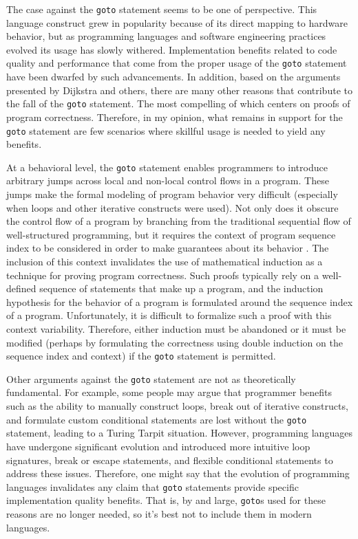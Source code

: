 \documentclass[12pt,letterpaper]{article}
\begin{document}
The case against the {\tt goto} statement seems to be one of perspective. This language construct 
grew in popularity because of its direct mapping to hardware behavior, but as programming languages
and software engineering practices evolved its usage has slowly withered. Implementation
benefits related to code quality and performance that come from the proper usage of the {\tt goto} 
statement have been dwarfed by such advancements. In addition, based on the arguments
presented by Dijkstra \cite{Dijkstra1968} and others, there are many other reasons that contribute to the 
fall of the {\tt goto} statement. The most compelling of which centers on proofs of program correctness. 
Therefore, in my opinion, what remains in support for the {\tt goto} statement are few scenarios 
where skillful usage is needed to yield any benefits.

At a behavioral level, the {\tt goto} statement enables programmers to introduce arbitrary jumps 
across local and non-local control flows in a program. These jumps
make the formal modeling of program behavior very difficult (especially when loops and other iterative constructs were used). 
Not only does it obscure the control flow of a program by 
branching from the traditional sequential flow of well-structured programming, but it requires the 
context of program sequence index to be considered in order to make guarantees about its
behavior \cite{Dijkstra1968}. The inclusion of this context invalidates the use of mathematical induction as a 
technique for proving program correctness. Such proofs typically rely on a well-defined 
sequence of statements that make up a program, and the induction hypothesis for the behavior of a 
program is formulated around the sequence index of a program. 
Unfortunately, it is difficult to formalize such a proof with this context variability. 
Therefore, either induction must be abandoned or it must be modified (perhaps by formulating the
correctness using double induction on the sequence index and context) if the {\tt goto} statement
is permitted. 

Other arguments against the {\tt goto} statement are not as theoretically fundamental. For example, 
some people may argue that programmer benefits such as the 
ability to manually construct loops, break out of iterative constructs, and formulate 
custom conditional statements are lost without the {\tt goto} statement, leading to a Turing Tarpit
situation. However, programming languages have undergone significant evolution and introduced 
more intuitive loop signatures, break or escape statements, and flexible conditional statements
to address these issues. Therefore, one might say that the evolution of programming languages
invalidates any claim that {\tt goto} statements provide specific implementation quality benefits. 
That is, by and large, {\tt goto}s used for these reasons are no longer needed, so it's best
not to include them in modern languages.
\end{document}
